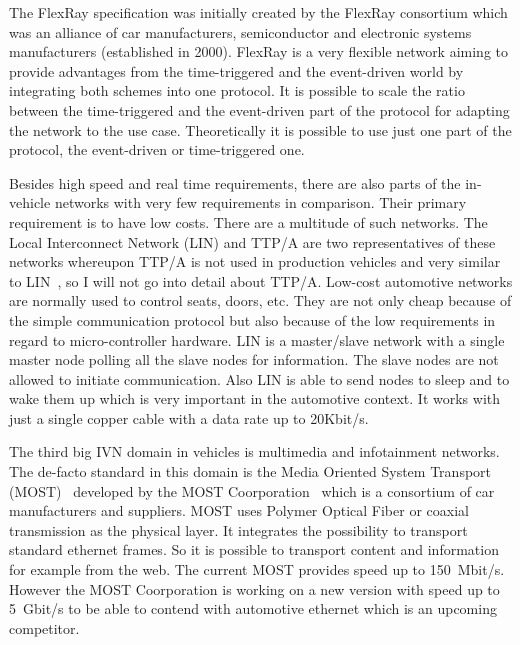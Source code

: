 The FlexRay specification was initially created by the FlexRay consortium which
was an alliance of car manufacturers, semiconductor and electronic systems
manufacturers (established in 2000). FlexRay is a very flexible network aiming
to provide advantages from the time-triggered and the event-driven world by
integrating both schemes into one protocol. It is possible to scale the ratio
between the time-triggered and the event-driven part of the protocol for
adapting the network to the use case. Theoretically it is possible to use just
one part of the protocol, the event-driven or time-triggered one.

Besides high speed and real time requirements, there are also parts of the
in-vehicle networks with very few requirements in comparison. Their primary
requirement is to have low costs. There are a multitude of such networks. The
Local Interconnect Network (LIN) and TTP/A are two representatives of these
networks whereupon TTP/A is not used in production vehicles and very similar to
LIN~\cite{Navet2017}, so I will not go into detail about TTP/A. Low-cost
automotive networks are normally used to control seats, doors, etc. They are not
only cheap because of the simple communication protocol but also because of the
low requirements in regard to micro-controller hardware. LIN is a master/slave
network with a single master node polling all the slave nodes for information.
The slave nodes are not allowed to initiate communication. Also LIN is able to
send nodes to sleep and to wake them up which is very important in the
automotive context. It works with just a single copper cable with a data rate up
to 20Kbit/s.

The third big IVN domain in vehicles is multimedia and infotainment networks.
The de-facto standard in this domain is the Media Oriented System Transport
(MOST)~\cite{Navet2017} developed by the MOST Coorporation~\cite{MOST2018} which
is a consortium of car manufacturers and suppliers. MOST uses Polymer Optical
Fiber or coaxial transmission as the physical layer. It integrates the
possibility to transport standard ethernet frames. So it is possible to
transport content and information for example from the web. The current MOST
provides speed up to 150~Mbit/s. However the MOST Coorporation is working on a
new version with speed up to 5~Gbit/s to be able to contend with automotive
ethernet which is an upcoming competitor.

